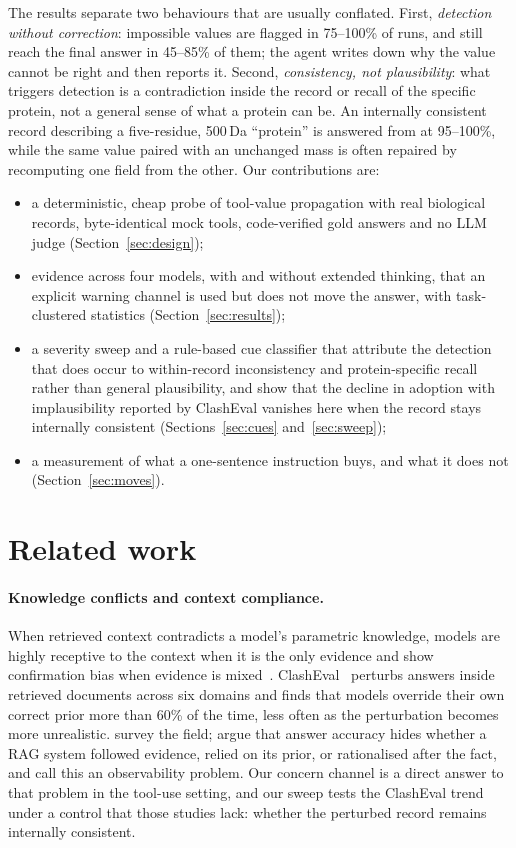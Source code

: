 \documentclass{article}
\begin{document}
The results separate two behaviours that are usually conflated. First, \emph{detection without correction}: impossible values are flagged in 75--100\% of runs, and still reach the final answer in 45--85\% of them; the agent writes down why the value cannot be right and then reports it. Second, \emph{consistency, not plausibility}: what triggers detection is a contradiction inside the record or recall of the specific protein, not a general sense of what a protein can be. An internally consistent record describing a five-residue, 500\,Da ``protein'' is answered from at 95--100\%, while the same value paired with an unchanged mass is often repaired by recomputing one field from the other. Our contributions are:
\begin{itemize}\setlength{\itemsep}{1pt}
  \item a deterministic, cheap probe of tool-value propagation with real biological records, byte-identical mock tools, code-verified gold answers and no LLM judge (Section~\ref{sec:design});
  \item evidence across four models, with and without extended thinking, that an explicit warning channel is used but does not move the answer, with task-clustered statistics (Section~\ref{sec:results});
  \item a severity sweep and a rule-based cue classifier that attribute the detection that does occur to within-record inconsistency and protein-specific recall rather than general plausibility, and show that the decline in adoption with implausibility reported by ClashEval vanishes here when the record stays internally consistent (Sections~\ref{sec:cues} and~\ref{sec:sweep});
  \item a measurement of what a one-sentence instruction buys, and what it does not (Section~\ref{sec:moves}).
\end{itemize}

\section{Related work}
\paragraph{Knowledge conflicts and context compliance.} When retrieved context contradicts a model's parametric knowledge, models are highly receptive to the context when it is the only evidence and show confirmation bias when evidence is mixed~\citep{xie2024adaptive}. ClashEval~\citep{wu2024clasheval} perturbs answers inside retrieved documents across six domains and finds that models override their own correct prior more than 60\% of the time, less often as the perturbation becomes more unrealistic. \citet{xu2024knowledge} survey the field; \citet{chen2026doesrag} argue that answer accuracy hides whether a RAG system followed evidence, relied on its prior, or rationalised after the fact, and call this an observability problem. Our concern channel is a direct answer to that problem in the tool-use setting, and our sweep tests the ClashEval trend under a control that those studies lack: whether the perturbed record remains internally consistent.
\end{document}
